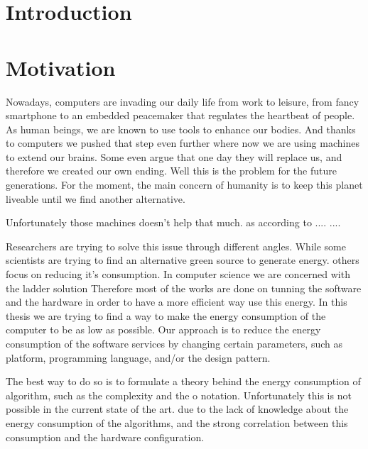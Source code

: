 \newpage

\chapter{Introduction }

\chapter{Motivation }

\label{chapter:introduction}

Nowadays, computers are invading our daily life from work to leisure, from fancy smartphone to an embedded peacemaker that regulates the heartbeat of people.
As human beings, we are known to use tools to enhance our bodies. And thanks to computers we pushed that step even further where now we are using machines to extend our brains. Some even argue that one day they will replace us, and therefore we created our own ending. Well this is the problem for the future generations. For the moment, the main concern of humanity is to keep this planet liveable until we find another alternative.

Unfortunately those machines doesn't help that much. as according to .... ....


Researchers are trying to solve this issue through different angles.
While some scientists are trying to find an alternative green source to generate energy. others focus on reducing it's%
consumption. In computer science we are concerned with the ladder solution %
Therefore most of the works are done on tunning the software and the hardware in order to have a more efficient way use this energy. %
In this thesis we are trying to find a way to make the energy consumption of the computer to be as low as possible. %
Our approach is to reduce the energy consumption of the software services by changing certain parameters, such as platform, programming language, and/or the design pattern.

The best way to do so is to formulate a theory behind the energy consumption of algorithm, such as the complexity and the o notation.
Unfortunately this is not possible in the current state of the art. due to the lack of knowledge about the energy consumption of the algorithms, and the strong correlation between this consumption and the hardware configuration.

